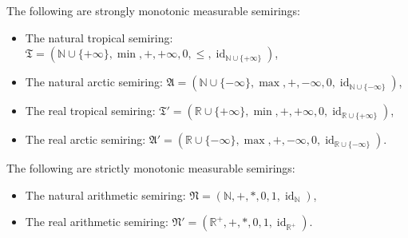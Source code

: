 \begin{example} 
    \label{example:real_semirings}
        The following are strongly monotonic measurable semirings:
        \begin{itemize}
            \item The natural tropical semiring: $\mathfrak{T} = (\mathbb{N} \cup \{+\infty\},\min,+,+\infty, 0,\leq, \operatorname{id}_{\mathbb{N} \cup \{+\infty\}})$,
            \item The natural arctic semiring: $\mathfrak{A} = (\mathbb{N} \cup \{-\infty\},\max,+,-\infty, 0,\operatorname{id}_{\mathbb{N} \cup \{-\infty\}})$,
            \item The real tropical semiring: $\mathfrak{T}' = (\mathbb{R} \cup \{+\infty\}, \min,+,+\infty, 0,\operatorname{id}_{\mathbb{R} \cup \{+\infty\}})$,
            \item The real arctic semiring: $\mathfrak{A}' = (\mathbb{R} \cup \{-\infty\},\max,+,-\infty, 0,\operatorname{id}_{\mathbb{R} \cup \{-\infty\}})$.
        \end{itemize}
        The following are strictly monotonic measurable semirings:
        \begin{itemize}
            \item The natural arithmetic semiring: $\mathfrak{N} = (\mathbb{N},+,*,0,1,\operatorname{id}_\mathbb{N})$,
            \item The real arithmetic semiring: $\mathfrak{N}' = (\mathbb{R}^+,+,*,0,1,\operatorname{id}_{\mathbb{R}^+})$.
        \end{itemize}   
\end{example}


